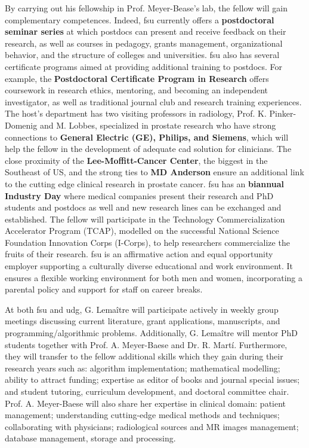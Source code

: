 By carrying out his fellowship in Prof. Meyer-Bease's lab, the fellow will gain complementary competences.
Indeed, \ac{fsu} currently offers a \textbf{postdoctoral seminar series} at which postdocs can present and receive feedback on their research, as well as courses in pedagogy, grants management, organizational behavior, and the structure of colleges and universities.
\ac{fsu} also has several certificate programs aimed at providing additional training to postdocs.
For example, the \textbf{Postdoctoral Certificate Program in Research} offers coursework in research ethics, mentoring, and becoming an independent investigator, as well as traditional journal club and research training experiences.
The host's department has two visiting professors in radiology, Prof. K. Pinker-Domenig and M. Lobbes, specialized in prostate research who have strong connections to \textbf{General Electric (GE), Philips, and Siemens}, which will help the fellow in the development of adequate \ac{cad} solution for clinicians.
The close proximity of the \textbf{Lee-Moffitt-Cancer Center}, the biggest in the Southeast of US, and the strong ties to \textbf{MD Anderson} ensure an additional link to the cutting edge clinical research in prostate cancer.
\ac{fsu} has an \textbf{biannual Industry Day} where medical companies present their research and PhD students and postdocs as well and new research lines can be exchanged and established.
The fellow will participate in the Technology Commercialization Accelerator Program (TCAP), modelled on the successful National Science Foundation Innovation Corps (I-Corps), to help researchers commercialize the fruits of their research.
\ac{fsu} is an affirmative action and equal opportunity employer supporting a culturally diverse educational and work environment.
It ensures a flexible working environment for both men and women, incorporating a parental policy and support for staff on career breaks.

At both \ac{fsu} and \ac{udg}, G. Lema\^itre will participate actively in weekly group meetings discussing current literature, grant applications, manuscripts, and programming/algorithmic problems.
Additionally, G. Lema\^itre will mentor PhD students together with Prof. A. Meyer-Baese and Dr. R. Mart\'i.
Furthermore, they will transfer to the fellow additional skills which they gain during their research years such as: algorithm implementation; mathematical modelling; ability to attract funding; expertise as editor of books and journal special issues; and student tutoring, curriculum development, and doctoral committee chair.
Prof. A. Meyer-Baese will also share her expertise in clinical domain: patient management; understanding cutting-edge medical methods and techniques; collaborating with physicians; radiological sources and MR images management; database management, storage and processing.

